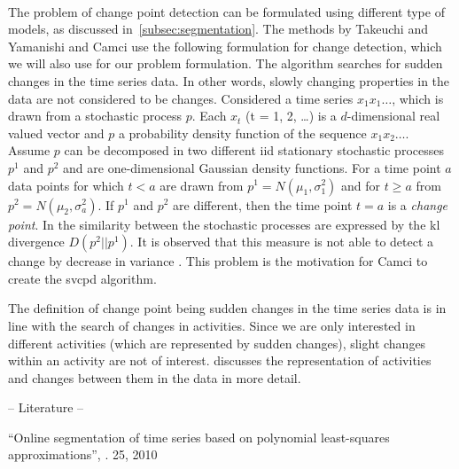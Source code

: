  \\
The problem of change point detection can be formulated using different type of models, as discussed in~\ref{subsec:segmentation}.
The methods by Takeuchi and Yamanishi \cite{takeuchi2006unifying} and Camci \cite{camci2010change} use the following formulation for change detection, which we will also use for our problem formulation.
The algorithm searches for sudden changes in the time series data.
In other words, slowly changing properties in the data are not considered to be changes.
Considered a time series $x_1 x_1 \dots$, which is drawn from a stochastic process $p$.
Each $x_t$ (t = 1, 2, \dots) is a $d$-dimensional real valued vector and $p$ a probability density function of the sequence $x_1 x_2 \dots$.
Assume $p$ can be decomposed in two different \gls{iid} stationary stochastic processes $p^1$ and $p^2$ and are one-dimensional Gaussian density functions.
For a time point $a$ data points for which $t < a$ are drawn from $p^1 = N(\mu_1, \sigma_1^2)$ and for $t \geq a$ from $p^2 = N(\mu_2, \sigma_a^2)$.
If $p^1$ and $p^2$ are different, then the time point $t = a$ is a \emph{change point}.
In \cite{takeuchi2006unifying} the similarity between the stochastic processes are expressed by the \gls{kl} divergence $D(p^2||p^1)$.
It is observed that this measure is not able to detect a change by decrease in variance \cite{takeuchi2006unifying,camci2010change}.
This problem is the motivation for Camci \cite{camci2010change} to create the \gls{svcpd} algorithm.

The definition of change point being sudden changes in the time series data is in line with the search of changes in activities.
Since we are only interested in different activities (which are represented by sudden changes), slight changes within an activity are not of interest.
 discusses the representation of activities and changes between them in the data in more detail.


-- Literature --

``Online segmentation of time series based on polynomial least-squares approximations'', \cite{fuchs2010online}. 25, 2010 \\


